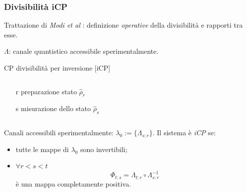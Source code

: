 \documentclass{beamer}
\begin{document}
\begin{frame}
\frametitle{Divisibilità iCP}
Trattazione di \emph{Modi et al} \cite{CPdoesnotimply}: definizione \emph{operative} della divisibilità e rapporti tra esse.

\(\Lambda \): canale quantistico accessibile sperimentalmente.
\pause
\begin{block}{CP divisibilità per inversione [iCP]}
\begin{columns}
	\begin{column}{0.5\textwidth}
		\begin{itemize}
			\item[r] preparazione stato \(\hat{\rho}_r\)
			\item[s] misurazione dello stato \(\hat{\rho}_s\)
		\end{itemize}
	\end{column}
	\begin{column}{0.3\textwidth}
		\resizebox{\textwidth}{!}{}
	\end{column}	
\end{columns}
 Canali accessibili sperimentalmente: \(\lambda_0 := \{\Lambda_{s\colon r}\}\). Il sistema è \emph{iCP} se:
 \begin{itemize}
    	\item tutte le mappe di \(\lambda_0\) sono invertibili;
    	\item \(\forall r<s<t\)
 	      \[\Phi_{t\colon s} = \Lambda_{t\colon r} \circ \Lambda^{-1}_{s\colon r}\]
 	      è una mappa completamente positiva.
 \end{itemize}
\end{block}

\end{frame}
\end{document}
